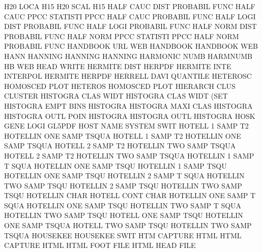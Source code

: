 H20      LOCA                           H15
H20      SCAL                           H15
HALF     CAUC DIST                      PROBABIL FUNC
HALF     CAUC PPCC                      STATISTI PPCC
HALF     CAUC                           PROBABIL FUNC
HALF     LOGI DIST                      PROBABIL FUNC
HALF     LOGI                           PROBABIL FUNC
HALF     NORM DIST                      PROBABIL FUNC
HALF     NORM PPCC                      STATISTI PPCC
HALF     NORM                           PROBABIL FUNC
HANDBOOK URL                            WEB      HANDBOOK
HANDBOOK                                WEB
HANN                                    HANNING
HANNING                                 HANNING
HARMONIC NUMB                           HARMNUMB
HB                                      WEB
HEAD                                    WRITE
HERMITE  DIST                           HERPDF
HERMITE  INTE                           INTERPOL
HERMITE                                 HERPDF
HERRELL  DAVI                           QUANTILE
HETEROSC                                HOMOSCED PLOT
HETEROS                                 HOMOSCED PLOT
HIERARCH CLUS                           CLUSTER
HISTOGRA CLAS WIDT                      HISTOGRA CLAS WIDT (SET
HISTOGRA EMPT BINS                      HISTOGRA
HISTOGRA MAXI CLAS                      HISTOGRA
HISTOGRA OUTL POIN                      HISTOGRA
HISTOGRA OUTL                           HISTOGRA
HOSK     GENE LOGI                      GL5PDF
HOST     NAME                           SYSTEM   SWIT
HOTELL   1    SAMP T2                   HOTELLIN ONE  SAMP TSQUA
HOTELL   1    SAMP T2                   HOTELLIN ONE  SAMP TSQUA
HOTELL   2    SAMP T2                   HOTELLIN TWO  SAMP TSQUA
HOTELL   2    SAMP T2                   HOTELLIN TWO  SAMP TSQUA
HOTELLIN 1    SAMP T    SQUA            HOTELLIN ONE  SAMP TSQU
HOTELLIN 1    SAMP TSQU                 HOTELLIN ONE  SAMP TSQU
HOTELLIN 2    SAMP T    SQUA            HOTELLIN TWO  SAMP TSQU
HOTELLIN 2    SAMP TSQU                 HOTELLIN TWO  SAMP TSQU
HOTELLIN CHAR                           HOTELL   CONT CHAR
HOTELLIN ONE  SAMP T    SQUA            HOTELLIN ONE  SAMP TSQU
HOTELLIN TWO  SAMP T    SQUA            HOTELLIN TWO  SAMP TSQU
HOTELL   ONE  SAMP TSQU                 HOTELLIN ONE  SAMP TSQUA
HOTELL   TWO  SAMP TSQU                 HOTELLIN TWO  SAMP TSQUA
HOUSEKEE                                HOUSEKEE SWIT
HTM                                     CAPTURE  HTML
HTML                                    CAPTURE  HTML
HTML     FOOT FILE                      HTML     HEAD FILE
